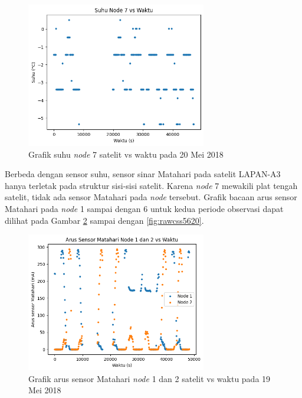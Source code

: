 \begin{figure}[H]
\setlength{}
\begin{center}
\includegraphics[width=0.7\textwidth]{fig/raw_node7_temp_2018-05-20.png}
	\caption{Grafik suhu \textit{node} 7 satelit vs waktu pada 20 Mei 2018}
\label{fig:rawtemp720}
\end{center}
\end{figure}

Berbeda dengan sensor suhu, sensor sinar Matahari pada satelit LAPAN-A3 hanya
terletak pada struktur sisi-sisi satelit. Karena \textit{node} 7 mewakili plat
tengah satelit, tidak ada sensor Matahari pada \textit{node} tersebut. Grafik
bacaan arus sensor Matahari pada \textit{node} 1 sampai dengan 6 untuk kedua
periode observasi dapat dilihat pada Gambar \ref{fig:rawcss1219} sampai dengan
\ref{fig:rawcss5620}.

\begin{figure}[H]
\setlength{}
\begin{center}
\includegraphics[width=0.7\textwidth]{fig/raw_node12_css_2018-05-19.png}
	\caption{Grafik arus sensor Matahari \textit{node} 1 dan 2 satelit vs waktu pada 19 Mei 2018}
\label{fig:rawcss1219}
\end{center}
\end{figure}


